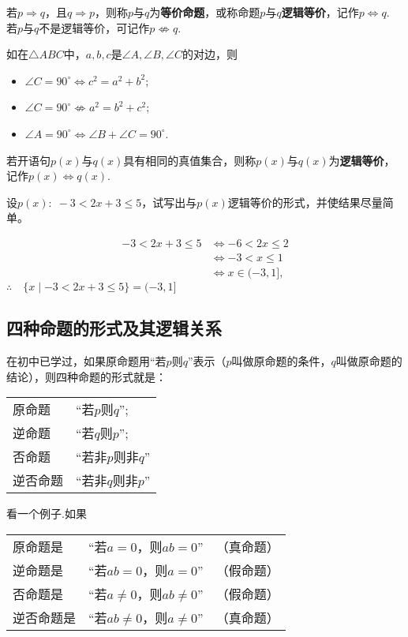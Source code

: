 若$p\Rightarrow q$，且$q\Rightarrow p$，则称$p$与$q$为\textbf{等价命题}，或称命题$p$与$q$\textbf{逻辑等价}，记作$p\Longleftrightarrow q$. 若$p$与$q$不是逻辑等价，可记作$p\not\Leftrightarrow q$.




如在$\triangle ABC$中，$a,b,c$是$\angle A,\angle B, \angle C$的对边，则
\begin{itemize}
    \item $\angle C=90^{\circ}\Longleftrightarrow c^2=a^2+b^2$;
    \item $\angle C=90^{\circ}\not\Leftrightarrow a^2=b^2+c^2$;
    \item $\angle A=90^{\circ}\Longleftrightarrow \angle B+\angle C=90^{\circ}$.
\end{itemize}

若开语句$p(x)$与$q(x)$具有相同的真值集合，则称$p(x)$与$q(x)$为\textbf{逻辑等价}，记作$p(x)\Longleftrightarrow q (x)$.

\begin{example}
    设$p(x):\; -3<2x+3\le 5$，试写出与$p(x)$逻辑等价的形式，并使结果尽量简单。
\end{example}

\begin{solution}
\[\begin{split}
    -3<2x+3\le 5 &\Longleftrightarrow -6<2x\le 2\\
    &\Longleftrightarrow -3<x\le 1\\
    &\Longleftrightarrow x\in (-3,1],
\end{split}\]
$\therefore\quad \{x\mid -3<2x+3\le 5\}=(-3,1]$
\end{solution}


\subsection*{四种命题的形式及其逻辑关系}
在初中已学过，如果原命题用“若$p$则$q$”表示（$p$叫做原命题的条件，$q$叫做原命题的结论），则四种命题的形式就是：
\begin{center}
\begin{tabular}{p{}p{}}
    原命题&“若$p$则$q$”;\\
逆命题&“若$q$则$p$”;\\
否命题&“若非$p$则非$q$”\\
逆否命题& “若非$q$则非$p$”
\end{tabular}
\end{center}

看一个例子.如果
\begin{center}
\begin{tabular}{p{}p{}p{}}
  原命题是  & “若$a=0$，则$ab=0$” &（真命题）\\
逆命题是 &“若$ab=0$，则$a=0$”  &（假命题）\\
否命题是 & “若$a\ne 0$，则$ab\ne 0$” &（假命题）\\
逆否命题是 & “若$ab\ne 0$，则$a\ne 0$” &（真命题）\\
\end{tabular}
\end{center}

